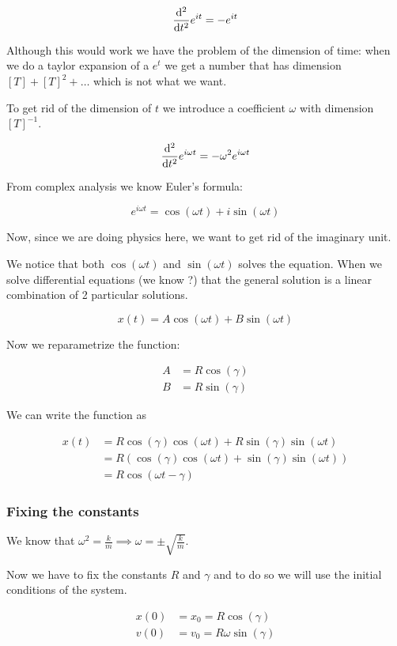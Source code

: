 \documentclass[14pt]{extarticle}
\begin{document}
$$
  \dv[2]{t}e^{i t} = - e^{i t}
$$

Although this would work we have the problem of the dimension of time: when we do a taylor expansion of a $e^t$ we get a number that has dimension $[T] + [T]^2 + \dots$ which is not what we want.

To get rid of the dimension of $t$ we introduce a coefficient $\omega$ with dimension $[T]^{-1}$.

$$
  \dv[2]{t}e^{i \omega t} = - \omega^2 e^{i \omega t}
$$

From complex analysis we know Euler's formula:

$$
  e^{i \omega t} = \cos (\omega t) + i \sin (\omega t)
$$

Now, since we are doing physics here, we want to get rid of the imaginary unit.

We notice that both $\cos(\omega t)$ and $\sin(\omega t)$ solves the equation. When we solve differential equations (we know ?) that the general solution is a linear combination of 2 particular solutions.

$$
  x(t) = A \cos(\omega t) + B \sin(\omega t)
$$

Now we reparametrize the function:

\begin{align*}
  A & = R \cos(\gamma) \\
  B & = R \sin(\gamma)
\end{align*}

We can write the function as

\begin{align*}
  x(t) & = R \cos(\gamma) \cos(\omega t) + R \sin(\gamma) \sin(\omega t)              \\
       & = R \left( \cos(\gamma) \cos(\omega t) + \sin(\gamma) \sin(\omega t) \right) \\
       & = R \cos(\omega t - \gamma)
\end{align*}

\subsubsection{Fixing the constants}

We know that $\omega^2 = \frac{k}{m} \implies \omega = \pm \sqrt{\frac{k}{m}}$.

Now we have to fix the constants $R$ and $\gamma$ and to do so we will use the initial conditions of the system.

\begin{align*}
  x(0) & = x_0 = R \cos(\gamma)        \\
  v(0) & = v_0 = R \omega \sin(\gamma)
\end{align*}
\end{document}
